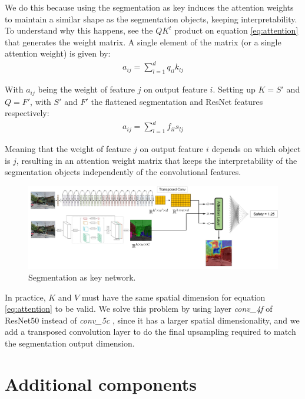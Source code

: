 We do this because using the segmentation as key induces the attention weights to maintain a similar shape as the segmentation objects,
keeping interpretability. To understand why this happens, see the $QK^t$ product on equation \ref{eq:attention} that generates the
weight matrix. A single element of the matrix (or a single attention weight) is given by:
\begin{align}
	a_{ij} = \sum_{l=1}^d q_{il}k_{lj}
\end{align}

With $a_{ij}$ being the weight of feature $j$ on output feature $i$. Setting up $K=S'$  and $Q=F'$, with $S'$ and $F'$ the flattened segmentation and ResNet features
respectively:
\begin{align}
	a_{ij} = \sum_{l=1}^d f_{il}s_{lj}
\end{align}

Meaning that the weight of feature $j$ on output feature $i$ depends on which object is $j$, resulting in an attention weight matrix
that keeps the  interpretability of the segmentation objects independently of the convolutional features.

\begin{figure}[ht]
	\begin{center}
	\includegraphics[width=1\textwidth]{./figures/segattn.png}
	\caption[Segmentation as key network]{Segmentation as key network.}
	\label{fig:segrank_1}
	\end{center}
\end{figure}

In practice, $K$ and $V$ must have the same spatial dimension for equation \ref{eq:attention} to be valid.
We solve this problem by using layer \textit{conv\_4f} of ResNet50 instead of \textit{conv\_5c}  , since it has a
larger spatial dimensionality, and we add a transposed convolution layer \cite{noh_deconv} to do the final upsampling
required to match the segmentation output dimension.

\section{Additional components}
\label{sec:adds}
